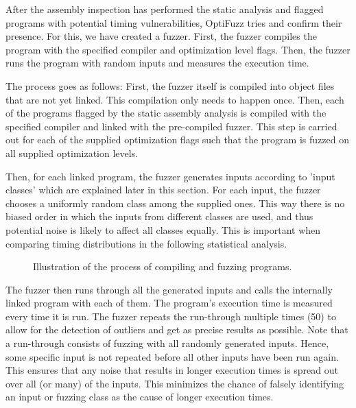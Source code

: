 After the assembly inspection has performed the static analysis and flagged programs with potential timing vulnerabilities, OptiFuzz tries and confirm their presence. 
For this, we have created a fuzzer.
First, the fuzzer compiles the program with the specified compiler and optimization level flags.
Then, the fuzzer runs the program with random inputs and measures the execution time.

The process goes as follows: 
First, the fuzzer itself is compiled into object files that are not yet linked. 
This compilation only needs to happen once. 
Then, each of the programs flagged by the static assembly analysis is compiled with the specified compiler and linked with the pre-compiled fuzzer. 
This step is carried out for each of the supplied optimization flags such that the program is fuzzed on all supplied optimization levels.

Then, for each linked program, the fuzzer generates inputs according to 'input classes' which are explained later in this section. 
For each input, the fuzzer chooses a uniformly random class among the supplied ones. 
This way there is no biased order in which the inputs from different classes are used, and thus potential noise is likely to affect all classes equally. 
This is important when comparing timing distributions in the following statistical analysis. 

\begin{figure}[H]
    \centering
    
    \caption{Illustration of the process of compiling and fuzzing programs.}
    \label{fig:fuzzer-pipeline}
  \end{figure}

The fuzzer then runs through all the generated inputs and calls the internally linked program with each of them. 
The program's execution time is measured every time it is run. 
The fuzzer repeats the run-through multiple times (50) to allow for the detection of outliers and get as precise results as possible. 
Note that a run-through consists of fuzzing with all randomly generated inputs.
Hence, some specific input is not repeated before all other inputs have been run again. 
This ensures that any noise that results in longer execution times is spread out over all (or many) of the inputs. 
This minimizes the chance of falsely identifying an input or fuzzing class as the cause of longer execution times.

